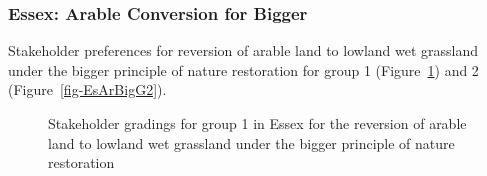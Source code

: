 \documentclass[
  12pt,
  letterpaper,
  DIV=11,
  numbers=noendperiod]{scrartcl}
\begin{document}
\newpage{}

\subsubsection{Essex: Arable Conversion for
Bigger}\label{essex-arable-conversion-for-bigger}

Stakeholder preferences for reversion of arable land to lowland wet
grassland under the bigger principle of nature restoration for group 1
(Figure~\ref{fig-EsArBigG1}) and 2 (Figure~\ref{fig-EsArBigG2}).

\begin{figure}[H]


\caption{\label{fig-EsArBigG1}Stakeholder gradings for group 1 in Essex
for the reversion of arable land to lowland wet grassland under the
bigger principle of nature restoration}

\end{figure}%
\end{document}
